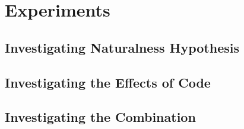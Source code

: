 \chapter{Experiments}
\label{experiments}

\section{Investigating Naturalness Hypothesis} %
\label{sec:investigating_naturalness_hypothesis}


\section{Investigating the Effects of Code} %
\label{sec:investigating_the_effects_of_code}


\section{Investigating the Combination} %
\label{sec:investigating_the_combination}

